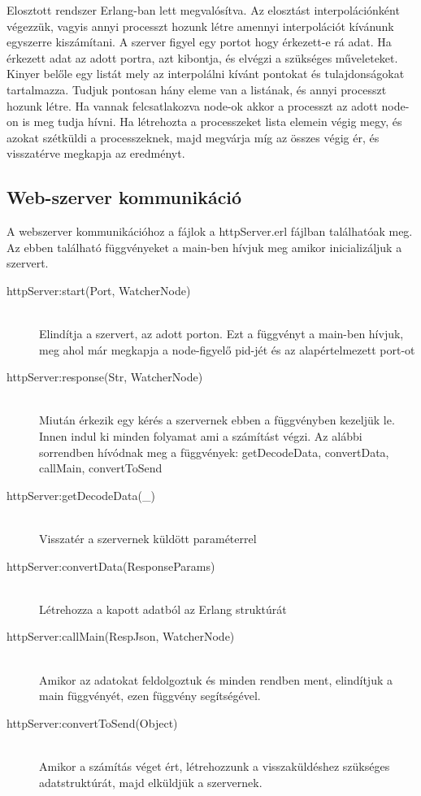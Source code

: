 Elosztott rendszer Erlang-ban lett megvalósítva. Az elosztást interpolációnként végezzük, vagyis annyi processzt hozunk létre amennyi interpolációt kívánunk egyszerre kiszámítani. \newline
A szerver figyel egy portot hogy érkezett-e rá adat. Ha érkezett adat az adott portra, azt kibontja, és elvégzi a szükséges műveleteket. Kinyer belőle egy listát mely az interpolálni kívánt pontokat és tulajdonságokat tartalmazza. \newline
Tudjuk pontosan hány eleme van a listának, és annyi processzt hozunk létre. Ha vannak felcsatlakozva node-ok akkor a processzt az adott node-on is meg tudja hívni.
Ha létrehozta a processzeket lista elemein végig megy, és azokat szétküldi a processzeknek, majd megvárja míg az összes végig ér, és visszatérve megkapja az eredményt.
\subsection{Web-szerver kommunikáció}
	A webszerver kommunikációhoz a fájlok a httpServer.erl fájlban találhatóak meg. Az ebben található függvényeket a main-ben hívjuk meg amikor inicializáljuk a szervert.
	\begin{description}
	\item[httpServer:start(Port, WatcherNode)] 
		\hfill \\
		Elindítja a szervert, az adott porton. \newline
		Ezt a függvényt a main-ben hívjuk, meg ahol már megkapja a node-figyelő pid-jét és az alapértelmezett port-ot 
	\item[httpServer:response(Str, WatcherNode)] \hfill \\ 
		Miután érkezik egy kérés a szervernek ebben a függvényben kezeljük le. Innen indul ki minden folyamat ami a számítást végzi. \newline 
		Az alábbi sorrendben hívódnak meg a függvények: \newline
		getDecodeData, convertData, callMain, convertToSend
	\item[httpServer:getDecodeData(\_)] \hfill \\ 
		Visszatér a szervernek küldött paraméterrel
	\item[httpServer:convertData(ResponseParams)] \hfill \\ 
		Létrehozza a kapott adatból az Erlang struktúrát
	\item[httpServer:callMain(RespJson, WatcherNode)] \hfill \\ 
		Amikor az adatokat feldolgoztuk és minden rendben ment, elindítjuk a main függvényét, ezen függvény segítségével.
	\item[httpServer:convertToSend(Object)] \hfill \\ 
		Amikor a számítás véget ért, létrehozzunk a visszaküldéshez szükséges adatstruktúrát, majd elküldjük a szervernek.
	\end{description}
